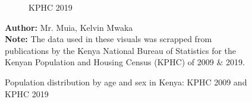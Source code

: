 \documentclass[a4paper]{article}
\begin{document}
\begin{figure}
\begin{subfigure}[b]{0.45\linewidth}
    \caption{\centering KPHC 2019}
    \label{fig:Population distribution by age and sex 2019}
  \end{subfigure}
  \caption{Population distribution by age and sex in Kenya: KPHC 2009 and KPHC 2019}
  \label{fig:KPHC comparison}
  \vspace{1em}
  \centering
  \textbf{Author:} Mr. Muia, Kelvin Mwaka \\
  \textbf{Note:} The data used in these visuals was scrapped from publications by the Kenya National Bureau of Statistics for the Kenyan Population and Housing Census (KPHC) of 2009 \& 2019.
\end{figure}
\end{document}
